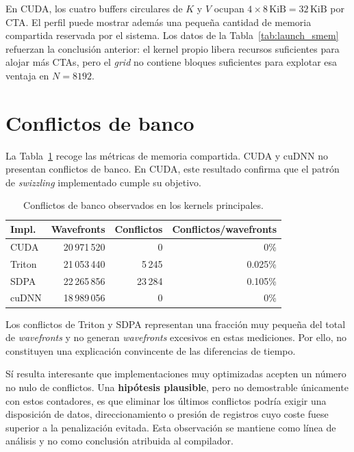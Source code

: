 En CUDA, los cuatro buffers circulares de \(K\) y \(V\) ocupan \(4\times8\,\text{KiB}=32\,\text{KiB}\) por CTA. El perfil puede mostrar además una pequeña cantidad de memoria compartida reservada por el sistema. Los datos de la Tabla~\ref{tab:launch_smem} refuerzan la conclusión anterior: el kernel propio libera recursos suficientes para alojar más CTAs, pero el \textit{grid} no contiene bloques suficientes para explotar esa ventaja en \(N=8192\).

\section{Conflictos de banco}

La Tabla~\ref{tab:bank_conflicts} recoge las métricas de memoria compartida. CUDA y cuDNN no presentan conflictos de banco. En CUDA, este resultado confirma que el patrón de \textit{swizzling} implementado cumple su objetivo.

\begin{table}[H]
\centering
\caption{Conflictos de banco observados en los kernels principales.}
\label{tab:bank_conflicts}
\begin{tabular}{lrrr}
\toprule
\textbf{Impl.} & \textbf{Wavefronts} & \textbf{Conflictos} & \textbf{Conflictos/wavefronts} \\
\midrule
CUDA   & 20\,971\,520 & 0      & 0\% \\
Triton & 21\,053\,440 & 5\,245  & 0.025\% \\
SDPA   & 22\,265\,856 & 23\,284 & 0.105\% \\
cuDNN  & 18\,989\,056 & 0      & 0\% \\
\bottomrule
\end{tabular}
\end{table}

Los conflictos de Triton y SDPA representan una fracción muy pequeña del total de \textit{wavefronts} y no generan \textit{wavefronts} excesivos en estas mediciones. Por ello, no constituyen una explicación convincente de las diferencias de tiempo.

Sí resulta interesante que implementaciones muy optimizadas acepten un número no nulo de conflictos. Una \textbf{hipótesis plausible}, pero no demostrable únicamente con estos contadores, es que eliminar los últimos conflictos podría exigir una disposición de datos, direccionamiento o presión de registros cuyo coste fuese superior a la penalización evitada. Esta observación se mantiene como línea de análisis y no como conclusión atribuida al compilador.

